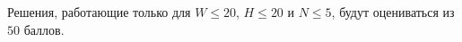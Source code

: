 Решения, работающие только для $W \le 20$, $H \le 20$ и $N \le 5$,
будут оцениваться из $50$ баллов.
